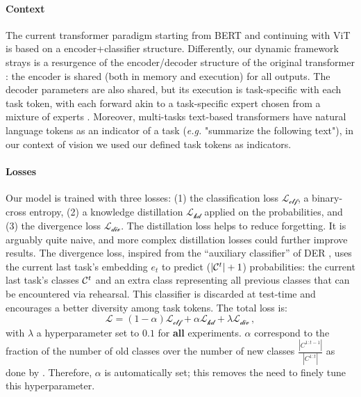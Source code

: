\vspace{-1em}
\paragraph{Context} The current transformer paradigm starting from BERT \cite{devlin2018bert} and
continuing with ViT \cite{dosovitskiy2020vit} is based on a encoder+classifier structure.
Differently, our dynamic framework strays is a resurgence of the encoder/decoder structure of the
original transformer \cite{vaswani2017transformer}: the encoder is shared (both in memory and
execution) for all outputs. The decoder parameters are also shared, but its execution is
task-specific with each task token, with each forward akin to a task-specific expert chosen from a
mixture of experts \cite{masoudnia2014mixture}. Moreover, multi-tasks text-based transformers have
natural language tokens as an indicator of a task \cite{raffel2019t5} (\textit{e.g.} "summarize the
following text"), in our context of vision we used our defined task tokens as indicators.

\label{sec:dytox_training}

\vspace{-0.5em}
\paragraph{Losses} Our model is trained with three losses: (1) the classification loss
$\mathcal{L_\text{clf}}$, a binary-cross entropy, (2) a knowledge distillation
\cite{hinton2015knowledge_distillation} $\mathcal{L_\text{kd}}$ applied on the probabilities, and
(3) the divergence loss $\mathcal{L_\text{div}}$. The distillation loss helps to reduce forgetting.
It is arguably quite naive, and more complex distillation losses
\cite{selvaraju2017gradcam,hou2019ucir,douillard2020podnet} could further improve results. The
divergence loss, inspired from the ``auxiliary classifier'' of DER \cite{yan2021der}, uses the
current last task's embedding $e_t$ to predict ($|\mathcal{C}^t| + 1$) probabilities: the current last
task's classes $\mathcal{C}^t$ and an extra class representing all previous classes that can be encountered
via rehearsal. This classifier is discarded at test-time and encourages a better diversity among
task tokens. The total loss is:
%
\begin{equation}
    \mathcal{L} = (1 - \alpha) \mathcal{L_\text{clf}} + \alpha \mathcal{L_\text{kd}} + \lambda \mathcal{L_\text{div}}\,,
    \label{eq:dytox_final_loss}
\end{equation}
%
with $\lambda$ a hyperparameter set to $0.1$ for \textbf{all} experiments. $\alpha$ correspond to
the fraction of the number of old classes over the number of new classes
$\frac{|C^{1:t-1}|}{|C^{1:t}|}$ as done by \cite{zhao2020weightalignement}. Therefore, $\alpha$ is
automatically set; this removes the need to finely tune this hyperparameter.


